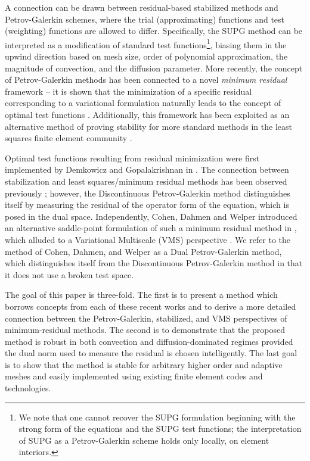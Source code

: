\documentclass[final,leqno]{siamltex}
\begin{document}
A connection can be drawn between residual-based stabilized methods and Petrov-Galerkin schemes, where the trial (approximating) functions and test (weighting) functions are allowed to differ.  Specifically, the SUPG method can be interpreted as a modification of standard test functions\footnote{We note that one cannot recover the SUPG formulation beginning with the strong form of the equations and the SUPG test functions; the interpretation of SUPG as a Petrov-Galerkin scheme holds only locally, on element interiors.}, biasing them in the upwind direction based on mesh size, order of polynomial approximation, the magnitude of convection, and the diffusion parameter.  More recently, the concept of Petrov-Galerkin methods has been connected to a novel \textit{minimum residual} framework -- it is shown that the minimization of a specific residual corresponding to a variational formulation naturally leads to the concept of optimal test functions \cite{overviewDPG}.  Additionally, this framework has been exploited as an alternative method of proving stability for more standard methods in the least squares finite element community \cite{lsqUltraWeak}.

Optimal test functions resulting from residual minimization were first implemented by Demkowicz and Gopalakrishnan in \cite{DPG2,DPG1}.  The connection between stabilization and least squares/minimum residual methods has been observed previously \cite{GLS}; however, the Discontinuous Petrov-Galerkin method distinguishes itself by measuring the residual of the operator form of the equation, which is posed in the dual space.  Independently, Cohen, Dahmen and Welper introduced an alternative saddle-point formulation of such a minimum residual method in \cite{DahmenVariationalStabilization}, which alluded to a Variational Multiscale (VMS) perspective \cite{VMS1,VMS2,HughesVMS}.  We refer to the method of Cohen, Dahmen, and Welper as a Dual Petrov-Galerkin method, which distinguishes itself from the Discontinuous Petrov-Galerkin method in that it does not use a broken test space.  

The goal of this paper is three-fold.  The first is to present a method which borrows concepts from each of these recent works and to derive a more detailed connection between the Petrov-Galerkin, stabilized, and VMS perspectives of minimum-residual methods.  The second is to demonstrate that the proposed method is robust in both convection and diffusion-dominated regimes provided the dual norm used to measure the residual is chosen intelligently.  The last goal is to show that the method is stable for arbitrary higher order and adaptive meshes and easily implemented using existing finite element codes and technologies. %
\end{document}

